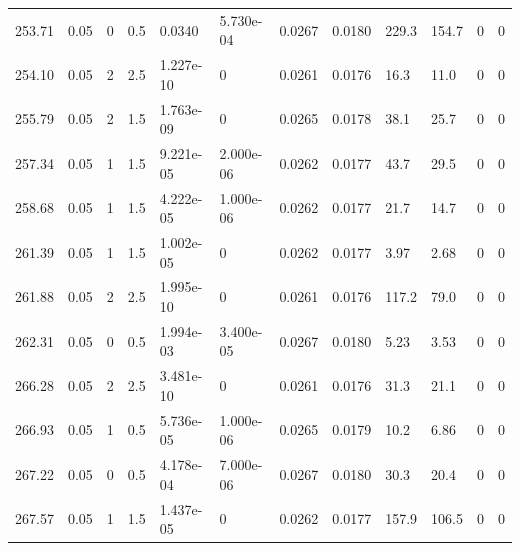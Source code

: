 \documentclass[preview]{standalone}
\begin{document}
{{{{\begin{tabular}{L{1.2cm}C{1.2cm} C{0.3cm}C{0.5cm} C{1.4cm}C{1.4cm} C{1.4cm}C{1.4cm} C{1.6cm}C{1.6cm} C{1.6cm}C{1.6cm}}
  253.71  &  0.05  & 0     & 0.5 &  0.0340  & 5.730e-04  &  0.0267&   0.0180& 229.3 & 154.7   &  0 & 0  \\ 
  254.10  &  0.05  & 2     & 2.5 &  1.227e-10  & 0  &  0.0261&   0.0176& 16.3 & 11.0   &  0 & 0  \\ 
  255.79  &  0.05  & 2     & 1.5 &  1.763e-09  & 0  &  0.0265&   0.0178& 38.1 & 25.7   &  0 & 0  \\ 
  257.34  &  0.05  & 1     & 1.5 &  9.221e-05  & 2.000e-06  &  0.0262&   0.0177& 43.7 & 29.5   &  0 & 0  \\ 
  258.68  &  0.05  & 1     & 1.5 &  4.222e-05  & 1.000e-06  &  0.0262&   0.0177& 21.7 & 14.7   &  0 & 0  \\ 
  261.39  &  0.05  & 1     & 1.5 &  1.002e-05  & 0  &  0.0262&   0.0177& 3.97 & 2.68   &  0 & 0  \\ 
  261.88  &  0.05  & 2     & 2.5 &  1.995e-10  & 0  &  0.0261&   0.0176& 117.2 & 79.0   &  0 & 0  \\ 
  262.31  &  0.05  & 0     & 0.5 &  1.994e-03  & 3.400e-05  &  0.0267&   0.0180& 5.23 & 3.53   &  0 & 0  \\ 
  266.28  &  0.05  & 2     & 2.5 &  3.481e-10  & 0  &  0.0261&   0.0176& 31.3 & 21.1   &  0 & 0  \\ 
  266.93  &  0.05  & 1     & 0.5 &  5.736e-05  & 1.000e-06  &  0.0265&   0.0179& 10.2 & 6.86   &  0 & 0  \\ 
  267.22  &  0.05  & 0     & 0.5 &  4.178e-04  & 7.000e-06  &  0.0267&   0.0180& 30.3 & 20.4   &  0 & 0  \\ 
  267.57  &  0.05  & 1     & 1.5 &  1.437e-05  & 0  &  0.0262&   0.0177& 157.9 & 106.5   &  0 & 0  \\ 
\hline 
\end{tabular} 

}}}}
\end{document}
